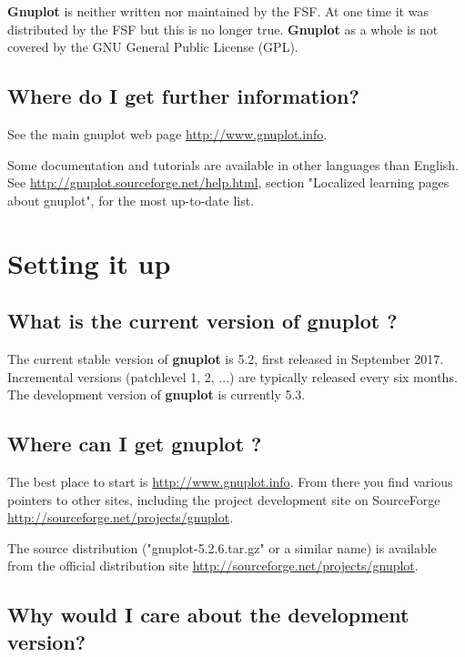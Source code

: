 \documentclass[a4paper,11pt]{article}
\def\http#1{{\small\href{http://#1}{\url{http://#1}}}}
\newcommand{\http}[1]%
            {\htmladdnormallink{\latex{\url{http://#1}}%
                    \html{\textit{http://#1}}}%
                {http://#1}%
            }
\newcommand{\gnuplot}{\textbf{gnuplot }}
\newcommand{\Gnuplot}{\textbf{Gnuplot }}
\begin{document}
\Gnuplot{} is neither written nor maintained by the FSF. At one time it
was distributed by the FSF but this is no longer true. \Gnuplot{} as a whole
is not covered by the GNU General Public License (GPL).


\subsection{Where do I get further information?}

See the main gnuplot web page \http{www.gnuplot.info}.

Some documentation and tutorials are available in other languages than English.
See \http{gnuplot.sourceforge.net/help.html}, section "Localized learning pages
about gnuplot", for the most up-to-date list.


\section{Setting it up}

\subsection{What is the current version of \gnuplot?}

The current stable version of \gnuplot is 5.2, first released in September 2017.
Incremental versions (patchlevel 1, 2, ...) are typically released every six months.
The development version of \gnuplot is currently 5.3.

\subsection{Where can I get \gnuplot?}
\label{where-get-gnuplot}

The best place to start is \http{www.gnuplot.info}. From there
you find various pointers to other sites, including the project
development site on SourceForge \http{sourceforge.net/projects/gnuplot}.

The source distribution ("gnuplot-5.2.6.tar.gz" or a similar name) is
available from the official distribution site \http{sourceforge.net/projects/gnuplot}.

\subsection{Why would I care about the development version?}
\end{document}
